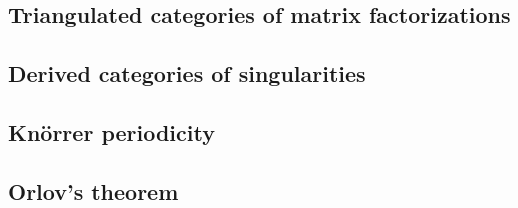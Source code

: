 
\subsection{Triangulated categories of matrix factorizations}
 
\subsection{Derived categories of singularities}

\subsection{Kn\"orrer periodicity}

\subsection{Orlov's theorem}
